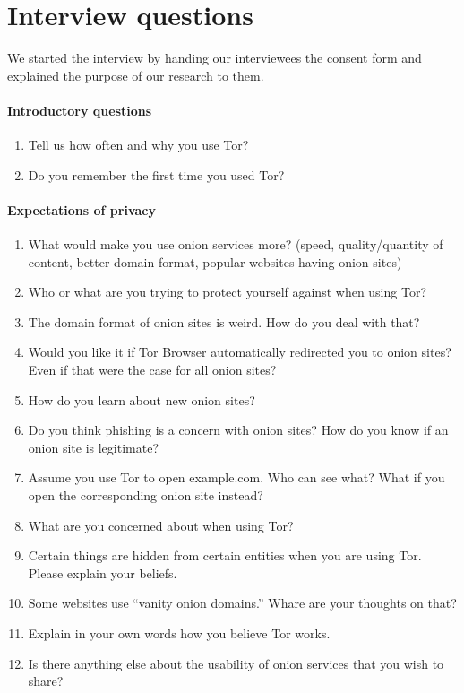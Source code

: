 \appendix

\section{Interview questions}
\label{app:interview-questions}

We started the interview by handing our interviewees the consent form and
explained the purpose of our research to them.

\paragraph{Introductory questions}
\begin{enumerate}
    \item Tell us how often and why you use Tor?
    \item Do you remember the first time you used Tor?
\end{enumerate}

\paragraph{Expectations of privacy}
\begin{enumerate}
    \item What would make you use onion services more? (speed, quality/quantity
        of content, better domain format, popular websites having onion sites)
    \item Who or what are you trying to protect yourself against when using Tor?
    \item The domain format of onion sites is weird.  How do you deal with that?
    \item Would you like it if Tor Browser automatically redirected you to onion
        sites?  Even if that were the case for all onion sites?
    \item How do you learn about new onion sites?
    \item Do you think phishing is a concern with onion sites?  How do you know
        if an onion site is legitimate?
    \item Assume you use Tor to open example.com.  Who can see what?  What if
        you open the corresponding onion site instead?
    \item What are you concerned about when using Tor?
    \item Certain things are hidden from certain entities when you are using
        Tor.  Please explain your beliefs.
    \item Some websites use ``vanity onion domains.''  Whare are your thoughts
        on that?
    \item Explain in your own words how you believe Tor works.
    \item Is there anything else about the usability of onion services that you
        wish to share?
\end{enumerate}
